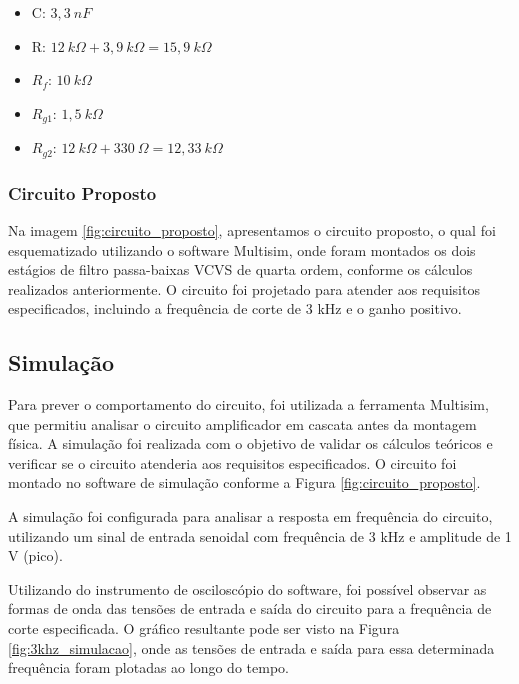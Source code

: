 \begin{itemize}
    \item C: $3,3~nF$
    \item R: $12~k\Omega + 3,9~k\Omega = 15,9~k\Omega$
    \item $R_f$: $10~k\Omega$
    \item $R_{g1}$: $1,5~k\Omega$
    \item $R_{g2}$: $12~k\Omega + 330~\Omega = 12,33~k\Omega$
\end{itemize}

\subsubsection{Circuito Proposto}

Na imagem \ref{fig:circuito_proposto}, apresentamos o circuito proposto, o qual foi esquematizado utilizando o software Multisim\textregistered, onde foram montados os dois estágios de filtro passa-baixas VCVS de quarta ordem, conforme os cálculos realizados anteriormente. O circuito foi projetado para atender aos requisitos especificados, incluindo a frequência de corte de 3 kHz e o ganho positivo.


\subsection{Simulação}

Para prever o comportamento do circuito, foi utilizada a ferramenta Multisim\textregistered, que permitiu analisar o circuito amplificador em cascata antes da montagem física. A simulação foi realizada com o objetivo de validar os cálculos teóricos e verificar se o circuito atenderia aos requisitos especificados. O circuito foi montado no software de simulação conforme a Figura \ref{fig:circuito_proposto}.

A simulação foi configurada para analisar a resposta em frequência do circuito, utilizando um sinal de entrada senoidal com frequência de 3 kHz e amplitude de 1 V (pico).

Utilizando do instrumento de osciloscópio do software, foi possível observar as formas de onda das tensões de entrada e saída do circuito para a frequência de corte especificada. O gráfico resultante pode ser visto na Figura \ref{fig:3khz_simulacao}, onde as tensões de entrada e saída para essa determinada frequência foram plotadas ao longo do tempo.

